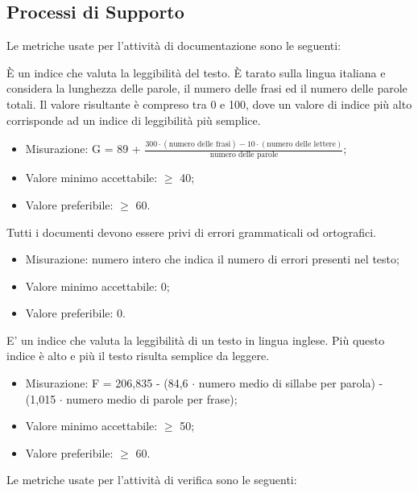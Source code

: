 \subsection{Processi di Supporto}

	Le metriche usate per l'attività di documentazione sono le seguenti:
	
		È un indice che valuta la leggibilità del testo. È tarato sulla lingua italiana e considera la lunghezza delle parole, il numero delle frasi ed il numero delle parole totali. Il valore risultante è compreso tra 0 e 100, dove un valore di indice più alto corrisponde ad un indice di leggibilità più semplice.
		 \begin{itemize}
			\item{Misurazione: G = 89 + $\displaystyle\frac{300 \cdot{} (\mbox{numero delle frasi}) - 10 \cdot{} (\mbox{numero delle lettere})}{\mbox{numero delle parole}}$;}
			\item{Valore minimo accettabile: $\geq$ 40;}
			\item{Valore preferibile: $\geq$ 60.}
		\end{itemize}

		Tutti i documenti devono essere privi di errori grammaticali od ortografici.
		\begin{itemize}
			\item{Misurazione: numero intero che indica il numero di errori presenti nel testo;}
			\item{Valore minimo accettabile: 0;}
			\item{Valore preferibile: 0.}
		\end{itemize}
		
		E' un indice che valuta la leggibilità di un testo in lingua inglese. Più questo indice è alto e più il testo risulta semplice da leggere.
		 \begin{itemize}
			\item{Misurazione: F = 206,835 - (84,6 $\cdot$ numero medio di sillabe per parola) - (1,015 $\cdot$ numero medio di parole per frase);}
			\item{Valore minimo accettabile: $\geq$ 50;}
			\item{Valore preferibile: $\geq$ 60.}
		\end{itemize}

					
	Le metriche usate per l'attività di verifica sono le seguenti:
	
